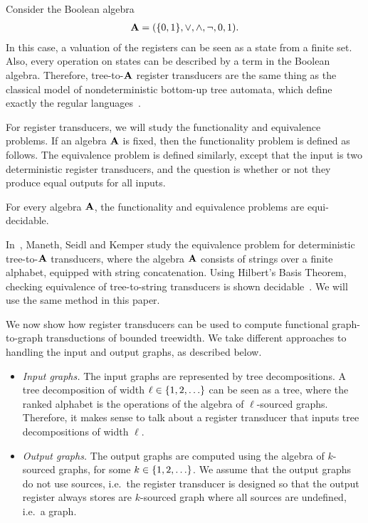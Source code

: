 \begin{example}
    Consider the  Boolean algebra
    \begin{align*}
    \mathbf{A} = (\{0,1\},\lor, \land, \neg, 0, 1).
    \end{align*}
    In this case, a valuation of the registers can be seen as a state from a finite set. Also, every operation on states can be described  by a term in the Boolean algebra. Therefore, tree-to-$\mathbf{A}$ register transducers are the same thing as the classical model of nondeterministic bottom-up tree automata, which define exactly the regular languages~\cite{}. 
\end{example}

For register transducers, we will study the functionality and equivalence problems. If an algebra $\mathbf{A}$ is fixed, then the functionality problem is defined as follows.
The equivalence problem is defined similarly, except that the input is two deterministic register transducers, and the question is whether or not they produce equal outputs for all inputs. 
\begin{fact}
    For every algebra $\mathbf{A}$, the functionality and equivalence problems are equi-decidable.
\end{fact}

\begin{example} In~\cite{seidlManethKemper2018}, Maneth, Seidl and Kemper study  the equivalence problem for  deterministic tree-to-$\mathbf{A}$ transducers,  where  the algebra $\mathbf{A}$ consists of strings over a finite alphabet, equipped with string concatenation.  Using Hilbert's Basis Theorem, checking equivalence of tree-to-string transducers is shown decidable~\cite[Corollary 8.2]{seidlManethKemper2018}. We will use the same method in this paper.
\end{example}


 We now show how register transducers can be used to compute functional graph-to-graph \mso transductions of bounded treewidth. We take different approaches to handling the input and output graphs, as described below.
\begin{itemize}
    \item \emph{Input graphs.} The input graphs are represented by tree decompositions. A tree decomposition of width $\ell \in \{1,2,\ldots\}$ can be seen as a tree, where the ranked alphabet is the operations of the algebra of $\ell$-sourced graphs.  Therefore, it makes sense to talk about a register transducer that inputs tree decompositions of width $\ell$. 
    \item \emph{Output graphs.} The output graphs are computed using the algebra of $k$-sourced graphs, for some $k \in \{1,2,\ldots\}$. We assume that the output graphs do not use sources, i.e.~the register transducer is designed so that the output register always stores are $k$-sourced graph where all sources are undefined, i.e.~a graph.
\end{itemize}

